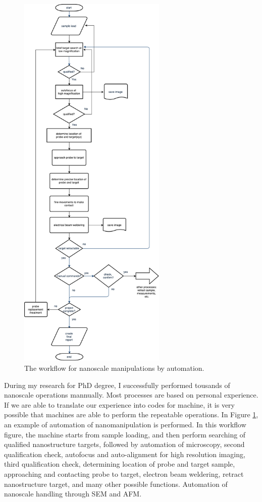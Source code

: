 \begin{figure}  
\centering
\includegraphics[width=200pt]{figures/aifornanomanipulation}
\caption[AI for Nanomanipulation]
{The workflow for nanoscale manipulations by automation.
\label{fig:7_aiworkflow}}
\end{figure}

During my research for PhD degree, I successfully performed tousands of nanoscale operations mannually. Most processes are based on personal experience. If we are able to translate our experience into codes for machine, it is very possible that machines are able to perform the repeatable operations. In Figure \ref{fig:7_aiworkflow}, an example of automation of nanomanipulation is performed. In this workflow figure, the machine starts from sample loading, and then perform searching of qualified nanostructure targets, followed by automation of microscopy, second qualification check, autofocus and auto-alignment for high resolution imaging, third qualification check, determining location of probe and target sample, approaching and contacting probe to target, electron beam weldering, retract nanostructure target, and many other possible functions. 
Automation of nanoscale handling through SEM and AFM. \cite{Sergej Fatikow}

